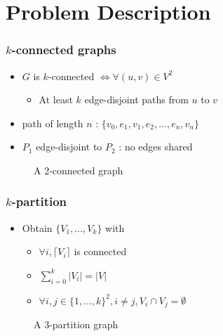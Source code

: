 \documentclass[xcolor=dvipsnames]{beamer}
\begin{document}
\section{Problem Description}

\begin{frame}
  \frametitle{$k$-connected graphs}
  \begin{itemize}
    \item $G$ is $k$-connected $\Leftrightarrow \forall (u,v) \in V^2$
      \begin{itemize}
      \item At least $k$ edge-disjoint paths from $u$ to $v$
      \end{itemize}
    \item path of length $n$ : $\{v_0,e_1,v_1,e_2, \dots , e_n,v_n\}$
    \item $P_1$ edge-disjoint to $P_2$ : no edges shared
  \end{itemize}
  \begin{figure}
    \begin{center}
    
    \end{center}
    \caption{A 2-connected graph}
  \end{figure}
\end{frame}

\begin{frame}
  \frametitle{$k$-partition}
  \begin{itemize}
  \item Obtain $\{V_1, \dots, V_k\}$ with
    \begin{itemize}
    \item $\forall i, \lceil V_i \rceil$ is connected
    \item $\sum\limits_{i=0}^k|V_i| = |V|$
    \item $\forall i,j \in \{1, \dots, k\}^2, i \neq j, V_i \cap V_j = \emptyset$
    \end{itemize}
  \end{itemize}
  \begin{figure}
    \begin{center}
      
    \end{center}
    \caption{A 3-partition graph}
  \end{figure}
\end{frame}
\end{document}
